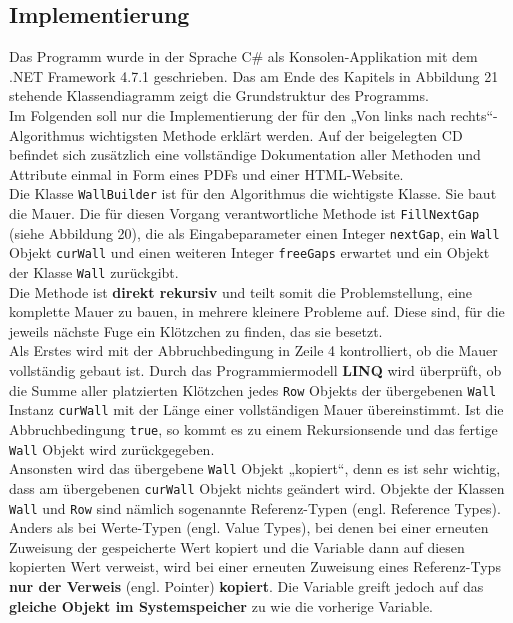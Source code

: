 \documentclass[a4paper,12pt]{article}
\newcommand{\code}{\texttt}
\begin{document}
\subsection{Implementierung}
Das Programm wurde in der Sprache C\# als Konsolen-Applikation mit dem .NET Framework 4.7.1 geschrieben.
Das am Ende des Kapitels in Abbildung 21 stehende Klassendiagramm zeigt die Grundstruktur des Programms.
\\[0.4cm]
Im Folgenden soll nur die Implementierung der für den „Von links nach rechts“-Algorithmus wichtigsten Methode erklärt werden. Auf der beigelegten CD befindet sich zusätzlich eine vollständige Dokumentation aller Methoden und Attribute einmal in Form eines PDFs und einer HTML-Website.
\\[0.4cm]
Die Klasse \code{WallBuilder} ist für den Algorithmus die wichtigste Klasse. Sie baut die Mauer. Die für diesen Vorgang verantwortliche Methode ist \code{FillNextGap} (siehe Abbildung 20), die als Eingabeparameter einen Integer \code{nextGap}, ein \code{Wall} Objekt \code{curWall} und einen weiteren Integer \code{freeGaps} erwartet und ein Objekt der Klasse \code{Wall} zurückgibt.
\\[0.4cm]
Die Methode ist \textbf{direkt rekursiv} und teilt somit die Problemstellung, eine komplette Mauer zu bauen, in mehrere kleinere Probleme auf. Diese sind, für die jeweils nächste Fuge ein Klötzchen zu finden, das sie besetzt.
\\[0.4cm]
Als Erstes wird mit der Abbruchbedingung in Zeile 4 kontrolliert, ob die Mauer vollständig gebaut ist. Durch das Programmiermodell \textbf{LINQ} wird überprüft, ob die Summe aller platzierten Klötzchen jedes \code{Row} Objekts der übergebenen \code{Wall} Instanz \code{curWall} mit der Länge einer vollständigen Mauer übereinstimmt.
Ist die Abbruchbedingung \code{true}, so kommt es zu einem Rekursionsende und das fertige \code{Wall} Objekt wird zurückgegeben.
\\[0.4cm]
Ansonsten wird das übergebene \code{Wall} Objekt „kopiert“, denn es ist sehr wichtig, dass am übergebenen \code{curWall} Objekt nichts geändert wird. Objekte der Klassen \code{Wall} und \code{Row} sind nämlich sogenannte Referenz-Typen (engl. Reference Types). Anders als bei Werte-Typen (engl. Value Types), bei denen bei einer erneuten Zuweisung der gespeicherte Wert kopiert und die Variable dann auf diesen kopierten Wert verweist, wird bei einer erneuten Zuweisung eines Referenz-Typs \textbf{nur der Verweis} (engl. Pointer) \textbf{kopiert}. Die Variable greift jedoch auf das \textbf{gleiche Objekt im Systemspeicher} zu wie die vorherige Variable.
\end{document}
